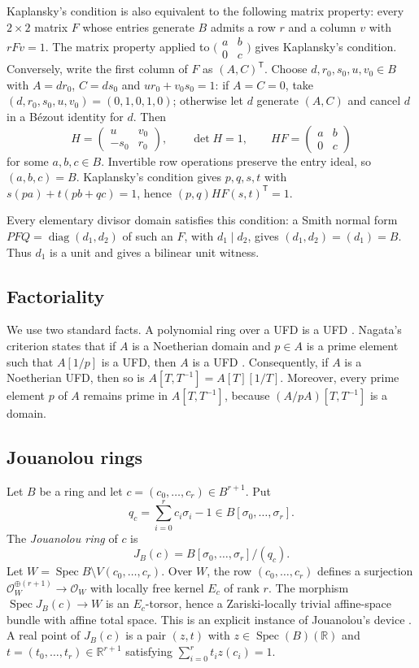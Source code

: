 \documentclass[11pt]{amsart}
\numberwithin{equation}{section}
\theoremstyle{definition}
\newcommand{\R}{\mathbb{R}}
\DeclareMathOperator{\Spec}{Spec}
\DeclareMathOperator{\diag}{diag}
\begin{document}
Kaplansky's condition is also equivalent to the following matrix property: every $2\times2$ matrix $F$ whose entries generate $B$ admits a row $r$ and a column $v$ with $rFv=1$. The matrix property applied to $\bigl(\begin{smallmatrix}a&b\\0&c\end{smallmatrix}\bigr)$ gives Kaplansky's condition. Conversely, write the first column of $F$ as $(A,C)^{\mathsf T}$. Choose $d,r_0,s_0,u,v_0\in B$ with $A=dr_0$, $C=ds_0$ and $ur_0+v_0s_0=1$: if $A=C=0$, take $(d,r_0,s_0,u,v_0)=(0,1,0,1,0)$; otherwise let $d$ generate $(A,C)$ and cancel $d$ in a B\'ezout identity for $d$. Then
\[
  H=\begin{pmatrix}u&v_0\\-s_0&r_0\end{pmatrix},\qquad
  \det H=1,\qquad HF=\begin{pmatrix}a&b\\0&c\end{pmatrix}
\]
for some $a,b,c\in B$. Invertible row operations preserve the entry ideal, so $(a,b,c)=B$. Kaplansky's condition gives $p,q,s,t$ with $s(pa)+t(pb+qc)=1$, hence $(p,q)HF(s,t)^{\mathsf T}=1$.

Every elementary divisor domain satisfies this condition: a Smith normal form $PFQ=\diag(d_1,d_2)$ of such an $F$, with $d_1\mid d_2$, gives $(d_1,d_2)=(d_1)=B$. Thus $d_1$ is a unit and gives a bilinear unit witness.

\subsection{Factoriality}
We use two standard facts. A polynomial ring over a UFD is a UFD \cite[Tag~0BC1]{Stacks}. Nagata's criterion states that if $A$ is a Noetherian domain and $p\in A$ is a prime element such that $A[1/p]$ is a UFD, then $A$ is a UFD \cite[Tag~0AFU]{Stacks}. Consequently, if $A$ is a Noetherian UFD, then so is $A[T,T^{-1}]=A[T][1/T]$. Moreover, every prime element $p$ of $A$ remains prime in $A[T,T^{-1}]$, because $(A/pA)[T,T^{-1}]$ is a domain.

\subsection{Jouanolou rings}
Let $B$ be a ring and let $c=(c_0,\ldots,c_r)\in B^{r+1}$. Put
\[
  q_c=\sum_{i=0}^r c_i\sigma_i-1\in B[\sigma_0,\ldots,\sigma_r].
\]
The \emph{Jouanolou ring} of $c$ is
\[
  J_B(c)=B[\sigma_0,\ldots,\sigma_r]/(q_c).
\]
Let $W=\Spec B\setminus V(c_0,\ldots,c_r)$. Over $W$, the row $(c_0,\ldots,c_r)$ defines a surjection $\mathcal O_W^{\oplus(r+1)}\to\mathcal O_W$ with locally free kernel $E_c$ of rank $r$. The morphism $\Spec J_B(c)\to W$ is an $E_c$-torsor, hence a Zariski-locally trivial affine-space bundle with affine total space. This is an explicit instance of Jouanolou's device \cite[Lemme~1.5]{Jouanolou}. A real point of $J_B(c)$ is a pair $(z,t)$ with $z\in\Spec(B)(\R)$ and $t=(t_0,\ldots,t_r)\in\R^{r+1}$ satisfying $\sum_{i=0}^r t_i z(c_i)=1$.
\end{document}
